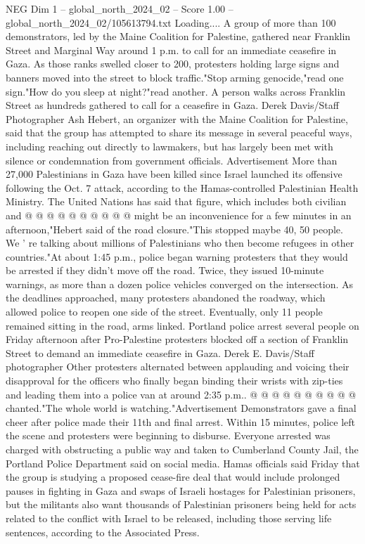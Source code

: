 \begin{textsample}{NEG Dim 1 – global\_north\_2024\_02 – Score 1.00 – global\_north\_2024\_02/105613794.txt}  \label{ex:f1_neg_186}
Loading....
A group of more than 100 demonstrators, led by the Maine Coalition for Palestine, gathered near Franklin Street and Marginal Way around 1 p.m. to call for an immediate ceasefire in Gaza.
As those ranks swelled closer to 200, protesters holding large signs and banners moved into the street to block traffic."Stop arming genocide,"read one sign."How do you sleep at night?"read another.
A person walks across Franklin Street as hundreds gathered to call for a ceasefire in Gaza.
Derek Davis/Staff Photographer Ash Hebert, an organizer with the Maine Coalition for Palestine, said that the group has attempted to share its message in several peaceful ways, including reaching out directly to lawmakers, but has largely been met with silence or condemnation from government officials.
Advertisement More than 27,000 Palestinians in Gaza have been killed since Israel launched its offensive following the Oct. 7 attack, according to the Hamas-controlled Palestinian Health Ministry.
The United Nations has said that figure, which includes both civilian and @ @ @ @ @ @ @ @ @ @ might be an inconvenience for a few minutes in an afternoon,"Hebert said of the road closure."This stopped maybe 40, 50 people.
We ' re talking about millions of Palestinians who then become refugees in other countries."At about 1:45 p.m., police began warning protesters that they would be arrested if they didn't move off the road.
Twice, they issued 10-minute warnings, as more than a dozen police vehicles converged on the intersection.
As the deadlines approached, many protesters abandoned the roadway, which allowed police to reopen one side of the street.
Eventually, only 11 people remained sitting in the road, arms linked.
Portland police arrest several people on Friday afternoon after Pro-Palestine protesters blocked off a section of Franklin Street to demand an immediate ceasefire in Gaza.
Derek E.
Davis/Staff photographer Other protesters alternated between applauding and voicing their disapproval for the officers who finally began binding their wrists with zip-ties and leading them into a police van at around 2:35 p.m.. @ @ @ @ @ @ @ @ @ @ chanted."The whole world is watching."Advertisement Demonstrators gave a final cheer after police made their 11th and final arrest.
Within 15 minutes, police left the scene and protesters were beginning to disburse.
Everyone arrested was charged with obstructing a public way and taken to Cumberland County Jail, the Portland Police Department said on social media.
Hamas officials said Friday that the group is studying a proposed cease-fire deal that would include prolonged pauses in fighting in Gaza and swaps of Israeli hostages for Palestinian prisoners, but the militants also want thousands of Palestinian prisoners being held for acts related to the conflict with Israel to be released, including those serving life sentences, according to the Associated Press.

\end{textsample}
